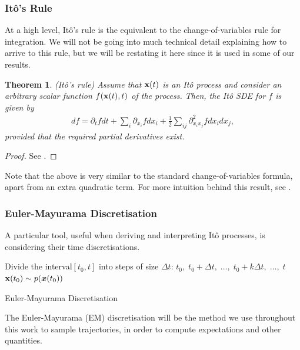 \documentclass[a4paper,12pt,twoside,openright]{report}
\newtheorem{theorem}{Theorem}
\theoremstyle{definition}
\begin{document}
\subsubsection{Itô's Rule}

At a high level, Itô's rule is the equivalent to the change-of-variables rule for integration. We will not be going into much technical detail explaining how to arrive to this rule, but we will be restating it here since it is used in some of our results. 

\begin{theorem}
  (Itô's rule) Assume that ${\mathbf{x}}(t)$ is an Itô process and consider an arbitrary scalar function $f({\mathbf{x}}(t), t)$ of the process. Then, the Itô SDE for $f$ is given by
  \begin{align}\label{eq:ito_rule}
      df = \partial_t f dt + \sum_i \partial_{{x_i}} f dx_i + \frac{1}{2}\sum_{ij} \partial^2_{{x_i}{x_j}} f dx_i dx_j,
  \end{align}
  provided that the required partial derivatives exist. 
\end{theorem}
\begin{proof}
See \cite{oksendal2003stochastic}.
\end{proof}
Note that the above is very similar to the standard change-of-variables formula, apart from an extra quadratic term. For more intuition behind this result, see \citet[Chapter~4]{sarkka2019applied}.

\subsubsection{Euler-Mayurama Discretisation}

A particular tool, useful when deriving and interpreting Itô processes, is considering their time discretisations.
\begin{algorithm} \label{alg:em}
Divide the interval$[t_0, t]$ into steps of size $\Delta t$: $t_0, \;t_0 + \Delta t,\; \hdots ,\; t_0 + k \Delta t,\; \hdots, \;t$ \\
${\mathbf{x}}(t_0) \sim p({\bm{x}}(t_0))$\\
\caption{Euler-Mayurama Discretisation }
\end{algorithm}
The Euler-Mayurama (EM) discretisation will be the method we use throughout this work to sample trajectories, in order to compute expectations and other quantities.
\end{document}
